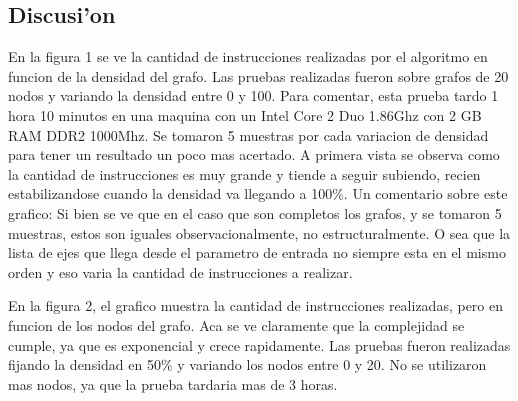 \subsection{Discusi'on}
En la figura 1 se ve la cantidad de instrucciones realizadas por el algoritmo en funcion de la densidad del grafo. Las pruebas realizadas fueron sobre grafos de 20 nodos y variando la densidad entre 0 y 100. Para comentar, esta prueba tardo 1 hora 10 minutos en una maquina con un Intel Core 2 Duo 1.86Ghz con 2 GB RAM DDR2 1000Mhz. Se tomaron 5 muestras por cada variacion de densidad para tener un resultado un poco mas acertado.
A primera vista se observa como la cantidad de instrucciones es muy grande y tiende a seguir subiendo, recien estabilizandose cuando la densidad va llegando a 100\%.
Un comentario sobre este grafico:
Si bien se ve que en el caso que son completos los grafos, y se tomaron 5 muestras, estos son iguales observacionalmente, no estructuralmente. O sea que la lista de ejes que llega desde el parametro de entrada no siempre esta en el mismo orden y eso varia la cantidad de instrucciones a realizar.

En la figura 2, el grafico muestra la cantidad de instrucciones realizadas, pero en funcion de los nodos del grafo. Aca se ve claramente que la complejidad se cumple, ya que es exponencial y crece rapidamente. Las pruebas fueron realizadas fijando la densidad en 50\% y variando los nodos entre 0 y 20. No se utilizaron mas nodos, ya que la prueba tardaria mas de 3 horas.
